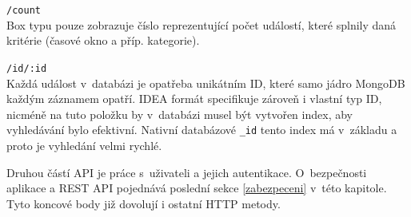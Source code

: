 \begin{description}
    \item \texttt{/count}\\
        Box typu  pouze zobrazuje číslo reprezentující počet událostí, které splnily daná kritérie (časové okno a příp. kategorie).
    
    \item \texttt{/id/:id}\\
        Každá událost v~databázi je opatřeba unikátním ID, které samo jádro MongoDB každým záznamem opatří. IDEA formát specifikuje zároveň i vlastní typ ID, nicméně na tuto položku by v~databázi musel být vytvořen index, aby vyhledávání bylo efektivní. Nativní databázové \texttt{\_id} tento index má v~základu a proto je vyhledání velmi rychlé.

\end{description}

Druhou částí API je práce s~uživateli a jejich autentikace. O~bezpečnosti aplikace a REST API pojednává poslední sekce \ref{zabezpeceni} v~této kapitole. Tyto koncové body již dovolují i ostatní HTTP metody.

